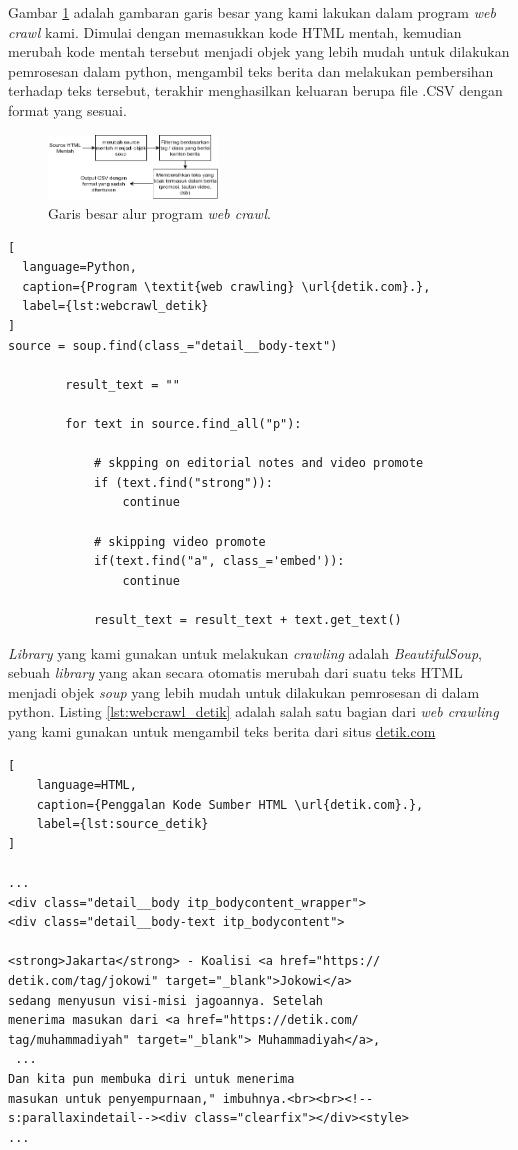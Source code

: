 Gambar \ref{fig:webcrawl_method} adalah gambaran garis besar yang kami lakukan dalam program \textit{web crawl} kami. Dimulai dengan memasukkan kode HTML mentah, kemudian merubah kode mentah tersebut menjadi objek yang lebih mudah untuk dilakukan pemrosesan dalam python, mengambil teks berita dan melakukan pembersihan terhadap teks tersebut, terakhir menghasilkan keluaran berupa file .CSV dengan format yang sesuai.

\begin{figure} [ht]
    \centering
    \includegraphics[width=0.4\textwidth]{gambar/webcrawl.png}
    \caption{Garis besar alur program \textit{web crawl}.}
    \label{fig:webcrawl_method}
\end{figure}

\begin{lstlisting}[
  language=Python,
  caption={Program \textit{web crawling} \url{detik.com}.},
  label={lst:webcrawl_detik}
]
source = soup.find(class_="detail__body-text")

        result_text = ""

        for text in source.find_all("p"):

            # skpping on editorial notes and video promote
            if (text.find("strong")):
                continue

            # skipping video promote
            if(text.find("a", class_='embed')):
                continue

            result_text = result_text + text.get_text()
\end{lstlisting}

\textit{Library} yang kami gunakan untuk melakukan \textit{crawling} adalah \textit{BeautifulSoup}, sebuah \textit{library} yang akan secara otomatis merubah dari suatu teks HTML menjadi objek \textit{soup} yang lebih mudah untuk dilakukan pemrosesan di dalam python. Listing \ref{lst:webcrawl_detik} adalah salah satu bagian dari \textit{web crawling} yang kami gunakan untuk mengambil teks berita dari situs \url{detik.com}

\begin{lstlisting}[
    language=HTML, 
    caption={Penggalan Kode Sumber HTML \url{detik.com}.},
    label={lst:source_detik}
]

...
<div class="detail__body itp_bodycontent_wrapper">
<div class="detail__body-text itp_bodycontent">

<strong>Jakarta</strong> - Koalisi <a href="https://
detik.com/tag/jokowi" target="_blank">Jokowi</a> 
sedang menyusun visi-misi jagoannya. Setelah 
menerima masukan dari <a href="https://detik.com/
tag/muhammadiyah" target="_blank"> Muhammadiyah</a>,
 ... 
Dan kita pun membuka diri untuk menerima 
masukan untuk penyempurnaan," imbuhnya.<br><br><!--
s:parallaxindetail--><div class="clearfix"></div><style>
...

\end{lstlisting}


